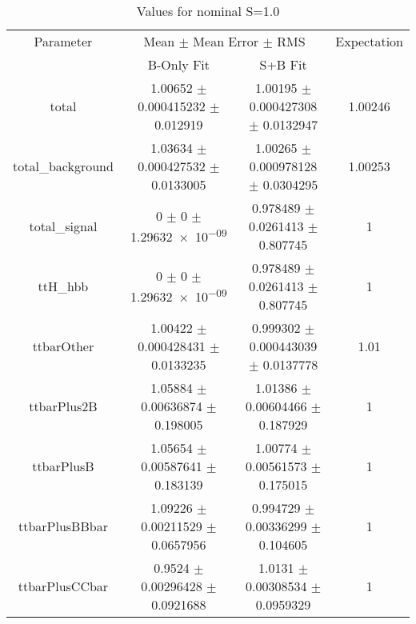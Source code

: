 \begin{table}
\centering
\caption{Values for nominal S=1.0}
\begin{tabular}{cccc}
\toprule
Parameter & \multicolumn{2}{c}{Mean $\pm$ Mean Error $\pm$ RMS} & Expectation\\
 & B-Only Fit & S+B Fit & \\
\midrule
total & \num{1.00652} $\pm$ \num{0.000415232} $\pm$ \num{0.012919} & \num{1.00195} $\pm$ \num{0.000427308} $\pm$ \num{0.0132947} & \num{1.00246}\\
total\_background & \num{1.03634} $\pm$ \num{0.000427532} $\pm$ \num{0.0133005} & \num{1.00265} $\pm$ \num{0.000978128} $\pm$ \num{0.0304295} & \num{1.00253}\\
total\_signal & \num{0} $\pm$ \num{0} $\pm$ \num{1.29632e-09} & \num{0.978489} $\pm$ \num{0.0261413} $\pm$ \num{0.807745} & \num{1}\\
ttH\_hbb & \num{0} $\pm$ \num{0} $\pm$ \num{1.29632e-09} & \num{0.978489} $\pm$ \num{0.0261413} $\pm$ \num{0.807745} & \num{1}\\
ttbarOther & \num{1.00422} $\pm$ \num{0.000428431} $\pm$ \num{0.0133235} & \num{0.999302} $\pm$ \num{0.000443039} $\pm$ \num{0.0137778} & \num{1.01}\\
ttbarPlus2B & \num{1.05884} $\pm$ \num{0.00636874} $\pm$ \num{0.198005} & \num{1.01386} $\pm$ \num{0.00604466} $\pm$ \num{0.187929} & \num{1}\\
ttbarPlusB & \num{1.05654} $\pm$ \num{0.00587641} $\pm$ \num{0.183139} & \num{1.00774} $\pm$ \num{0.00561573} $\pm$ \num{0.175015} & \num{1}\\
ttbarPlusBBbar & \num{1.09226} $\pm$ \num{0.00211529} $\pm$ \num{0.0657956} & \num{0.994729} $\pm$ \num{0.00336299} $\pm$ \num{0.104605} & \num{1}\\
ttbarPlusCCbar & \num{0.9524} $\pm$ \num{0.00296428} $\pm$ \num{0.0921688} & \num{1.0131} $\pm$ \num{0.00308534} $\pm$ \num{0.0959329} & \num{1}\\
\bottomrule
\end{tabular}
\end{table}